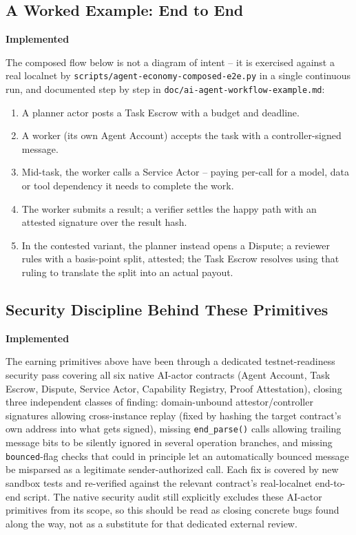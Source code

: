 \documentclass[11pt,oneside]{article}
\newcommand{\implemented}{\textbf{Implemented}}
\begin{document}
\subsection{A Worked Example: End to End} \hfill \implemented

The composed flow below is not a diagram of intent -- it is exercised against a real localnet
by \texttt{scripts/agent-economy-composed-e2e.py} in a single continuous run, and documented
step by step in \texttt{doc/ai-agent-workflow-example.md}:

\begin{enumerate}[noitemsep]
  \item A planner actor posts a Task Escrow with a budget and deadline.
  \item A worker (its own Agent Account) accepts the task with a controller-signed message.
  \item Mid-task, the worker calls a Service Actor -- paying per-call for a model, data or
  tool dependency it needs to complete the work.
  \item The worker submits a result; a verifier settles the happy path with an attested
  signature over the result hash.
  \item In the contested variant, the planner instead opens a Dispute; a reviewer rules with a
  basis-point split, attested; the Task Escrow resolves using that ruling to translate the
  split into an actual payout.
\end{enumerate}

\subsection{Security Discipline Behind These Primitives} \hfill \implemented

The earning primitives above have been through a dedicated testnet-readiness security pass
covering all six native AI-actor contracts (Agent Account, Task Escrow, Dispute, Service
Actor, Capability Registry, Proof Attestation), closing three independent classes of finding:
domain-unbound attestor/controller signatures allowing cross-instance replay (fixed by hashing
the target contract's own address into what gets signed), missing \texttt{end\_parse()} calls
allowing trailing message bits to be silently ignored in several operation branches, and
missing \texttt{bounced}-flag checks that could in principle let an automatically bounced
message be misparsed as a legitimate sender-authorized call. Each fix is covered by new
sandbox tests and re-verified against the relevant contract's real-localnet end-to-end script.
The native security audit still explicitly excludes these AI-actor
primitives from its scope, so this should be read as closing concrete bugs found along the
way, not as a substitute for that dedicated external review.
\end{document}

